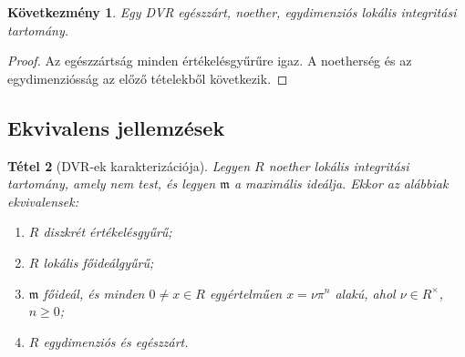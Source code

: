 \documentclass[11pt,a4paper]{article}
\newtheorem{tetel}{Tétel}[section]
\newtheorem{kovetkezmeny}[tetel]{Következmény}
\theoremstyle{definition}
\newcommand{\mm}{\mathfrak m}
\begin{document}
\begin{kovetkezmeny}
Egy DVR egészzárt, noether, egydimenziós lokális integritási
tartomány.
\end{kovetkezmeny}

\begin{proof}
Az egészzártság minden értékelésgyűrűre igaz. A noetherség és
az egydimenziósság az előző tételekből következik.
\end{proof}

\subsection{Ekvivalens jellemzések}

\begin{tetel}[DVR-ek karakterizációja]
Legyen $R$ noether lokális integritási tartomány, amely nem test, és
legyen $\mm$ a maximális ideálja. Ekkor az alábbiak ekvivalensek:
\begin{enumerate}
  \item $R$ diszkrét értékelésgyűrű;
  \item $R$ lokális főideálgyűrű;
  \item $\mm$ főideál, és minden $0\neq x\in R$ egyértelműen
        $x=\nu\pi^n$ alakú, ahol $\nu\in R^\times$, $n\geq 0$;
  \item $R$ egydimenziós és egészzárt.
\end{enumerate}
\end{tetel}
\end{document}
